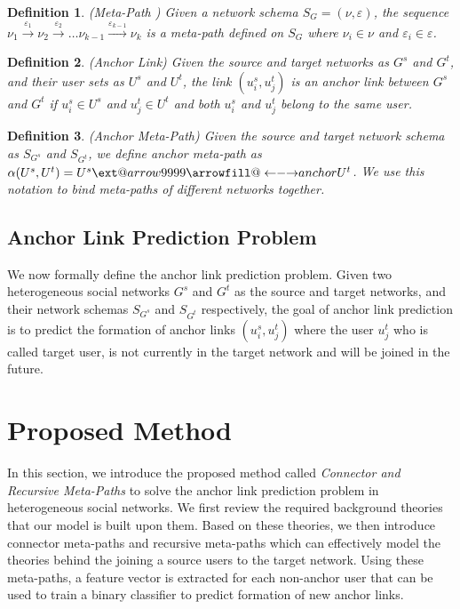 \documentclass[conference]{IEEEtran}
\makeatletter
\newtheorem{definition}{Definition}[section]
\newcommand\xleftrightarrow[2][]{%
  \ext@arrow 9999{\longleftrightarrowfill@}{#1}{#2}}
\newcommand\longleftrightarrowfill@{%
  \arrowfill@\leftarrow\relbar\rightarrow}
\makeatother
\begin{document}
\begin{definition}{(Meta-Path \cite{sun2012mining})}
Given a network schema $S_G=(\nu, \varepsilon)$, the sequence $\nu_1\xrightarrow{\varepsilon_1}\nu_2\xrightarrow{\varepsilon_2}\dots\nu_{k-1}\xrightarrow{\varepsilon_{k-1}}\nu_k$ is a meta-path defined on $S_G$ where $\nu_i\in \nu$ and $\varepsilon_i\in \varepsilon$.
\end{definition}

\begin{definition}{(Anchor Link)}
Given the source and target networks as $G^s$ and $G^t$, and their user sets as $U^s$ and $U^t$, the link $(u_i^s, u_j^t)$ is an anchor link between $G^s$ and $G^t$ if $u_i^s\in U^s$ and $u_j^t\in U^t$ and both $u_i^s$ and $u_j^t$ belong to the same user.
\end{definition}

\begin{definition}{(Anchor Meta-Path)}
Given the source and target network schema as $S_{G^s}$ and $S_{G^t}$, we define anchor meta-path as $\alpha(U^s,U^t)=U^s\xleftrightarrow{anchor}U^t$. We use this notation to bind meta-paths of different networks together.
\end{definition}

\subsection{Anchor Link Prediction Problem}
We now formally define the anchor link prediction problem. Given two heterogeneous social networks $G^s$ and $G^t$ as the source and target networks, and their network schemas $S_{G^s}$ and $S_{G^t}$ respectively, the goal of anchor link prediction is to predict the formation of anchor links $(u_i^s, u_j^t)$ where the user $u_j^t$ who is called target user, is not currently in the target network and will be joined in the future.

\section{Proposed Method}\label{sec:method}

In this section, we introduce the proposed method called \textit{Connector and Recursive Meta-Paths} to solve the anchor link prediction problem in heterogeneous social networks. We first review the required background theories that our model is built upon them. Based on these theories, we then introduce connector meta-paths and recursive meta-paths which can effectively model the theories behind the joining a source users to the target network. Using these meta-paths, a feature vector is extracted for each non-anchor user that can be used to train a binary classifier to predict formation of new anchor links.
\end{document}
